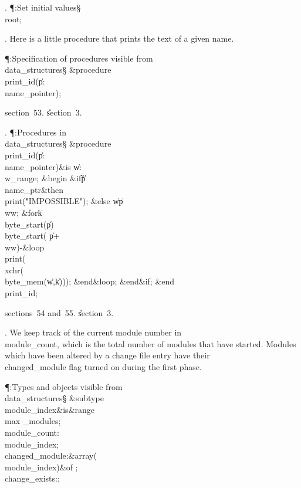 . \P\?:Set initial values\X\mathrel{+}\S\?\6
\\{root}\?\K{};\par
\fi

. Here is a little procedure that prints the text of a given name.

\Y\P\?\4:Specification of procedures visible from \\{data\_structures}\X\S%
\?\6
\&{procedure}\8\1\\{print\_id}\?(\1\?\|p\?:\?\\{name\_pointer}\?\2)\?\2;\par
\A section~53.
\U section~3\*.\fi

. \P\?:Procedures in \\{data\_structures}\X\S\?\6
\&{procedure}\8\1\\{print\_id}\?(\1\?\|p\?:\?\\{name\_pointer}\?\2)\?\2\8\&{is}%
\8\1\6
\|w\?:\?\\{w\_range};\6
\4\&{begin}\6
\&{if}\1\1\8\|p\?\G\?\\{name\_ptr}\2\8\&{then}\6
\\{print}\?\1(\?\.{"IMPOSSIBLE"}\?\2)\?;\6
\4\&{else}\6
\|w\?\K\?\|p\?\?\\{ww};\6
\1\&{for}\8\|k\?\in\?\\{byte\_start}\?\1(\?\|p\?\2)\to\?\\{byte\_start}\?\1(\?%
\|p\?+\?\\{ww}\?\2)-\8\&{loop}\6
\\{print}\?\1(\?\\{xchr}\?\1(\?\\{byte\_mem}\?\1(\?\|w\?,\?\|k\?\2)\2)\2)\?;%
\2\6
\&{end}\8\&{loop};\2\6
\&{end}\8\2\&{if}\1;\2\6
\&{end}\8\\{print\_id};\par
\A sections~54 and~55.
\U section~3\*.\fi

. We keep track of the current module number in
\\{module\_count}, which is the total number of modules that have started.
Modules which have been altered by a change file entry
have their \\{changed\_module} flag turned on during the first phase.

\Y\P\?\4:Types and objects visible from \\{data\_structures}\X\mathrel{+}\S%
\?\6
\&{subtype}\8\\{module\_index}\8\&{is}\8\8\&{range}\?\to\?\\{max%
\_modules};\6
\\{module\_count}\?:\?\\{module\_index};\6
\\{changed\_module}\?:\1\&{array}\8\1(\?\\{module\_index}\?\2)\2\8\&{of}\?\8%
;\6
\\{change\_exists}\?:\?;\par
\fi

